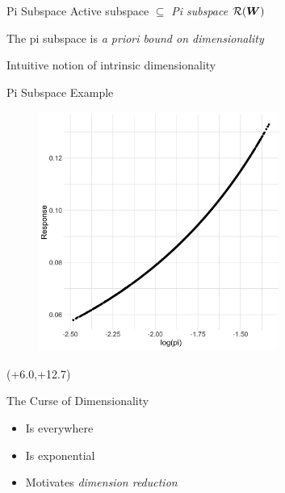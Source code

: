 \documentclass[14pt]{beamer}
\begin{document}
\begin{frame}{Pi Subspace}
  Active subspace $\subseteq$ \emph{Pi subspace} $\mathcal{R}(\boldsymbol{W})$

  \bigskip The pi subspace is \emph{a priori bound on dimensionality}

  \bigskip Intuitive notion of intrinsic dimensionality
\end{frame}

\begin{frame}{Pi Subspace Example}
  \begin{figure}
    \centering
    \includegraphics[width=0.7\textwidth]{../images/as_summary_pi}
  \end{figure}

  \begin{textblock}{7}(+6.0,+12.7)
  \end{textblock}
\end{frame}


\begin{frame}{The Curse of Dimensionality}
  \begin{itemize}
  \item Is everywhere
  \item Is exponential
  \item Motivates \emph{dimension reduction}
  \end{itemize}
\end{frame}
\end{document}
